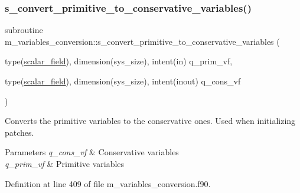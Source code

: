 \subsubsection{\texorpdfstring{s\+\_\+convert\+\_\+primitive\+\_\+to\+\_\+conservative\+\_\+variables()}{s\_convert\_primitive\_to\_conservative\_variables()}}
{\footnotesize\ttfamily subroutine m\+\_\+variables\+\_\+conversion\+::s\+\_\+convert\+\_\+primitive\+\_\+to\+\_\+conservative\+\_\+variables (\begin{DoxyParamCaption}\item[{type(\hyperlink{structm__derived__types_1_1scalar__field}{scalar\+\_\+field}), dimension(sys\+\_\+size), intent(in)}]{q\+\_\+prim\+\_\+vf,  }\item[{type(\hyperlink{structm__derived__types_1_1scalar__field}{scalar\+\_\+field}), dimension(sys\+\_\+size), intent(inout)}]{q\+\_\+cons\+\_\+vf }\end{DoxyParamCaption})}



Converts the primitive variables to the conservative ones. Used when initializing patches. 


\begin{DoxyParams}{Parameters}
{\em q\+\_\+cons\+\_\+vf} & Conservative variables \\
\hline
{\em q\+\_\+prim\+\_\+vf} & Primitive variables \\
\hline
\end{DoxyParams}


Definition at line 409 of file m\+\_\+variables\+\_\+conversion.\+f90.

\mbox{\label{namespacem__variables__conversion_add70754fa3c57535e4bc79c012962dc6}} 
